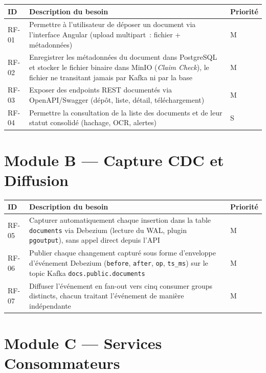 \documentclass[12pt,a4paper,openany]{report}
\begin{document}
    \begin{longtable}{p{1.3cm}p{9.2cm}p{1.5cm}}
      \toprule
      \textbf{ID} & \textbf{Description du besoin} & \textbf{Priorit\'e} \\
      \midrule
      \endhead
      \bottomrule
      \endfoot

      RF-01 & Permettre \`a l'utilisateur de d\'eposer un document via l'interface Angular (upload multipart~: fichier + m\'etadonn\'ees) & M \\[4pt]
      RF-02 & Enregistrer les m\'etadonn\'ees du document dans PostgreSQL et stocker le fichier binaire dans MinIO (\emph{Claim Check}), le fichier ne transitant jamais par Kafka ni par la base & M \\[4pt]
      RF-03 & Exposer des endpoints REST document\'es via OpenAPI/Swagger (d\'ep\^ot, liste, d\'etail, t\'el\'echargement) & M \\[4pt]
      RF-04 & Permettre la consultation de la liste des documents et de leur statut consolid\'e (hachage, OCR, alertes) & S \\
    \end{longtable}

    \section{Module B --- Capture CDC et Diffusion}

    \begin{longtable}{p{1.3cm}p{9.2cm}p{1.5cm}}
      \toprule
      \textbf{ID} & \textbf{Description du besoin} & \textbf{Priorit\'e} \\
      \midrule
      \endhead
      \bottomrule
      \endfoot

      RF-05 & Capturer automatiquement chaque insertion dans la table \texttt{documents} via Debezium (lecture du WAL, plugin \texttt{pgoutput}), sans appel direct depuis l'API & M \\[4pt]
      RF-06 & Publier chaque changement captur\'e sous forme d'enveloppe d'\'ev\'enement Debezium (\texttt{before}, \texttt{after}, \texttt{op}, \texttt{ts\_ms}) sur le topic Kafka \texttt{docs.public.documents} & M \\[4pt]
      RF-07 & Diffuser l'\'ev\'enement en fan-out vers cinq consumer groups distincts, chacun traitant l'\'ev\'enement de mani\`ere ind\'ependante & M \\
    \end{longtable}

    \section{Module C --- Services Consommateurs}
\end{document}

